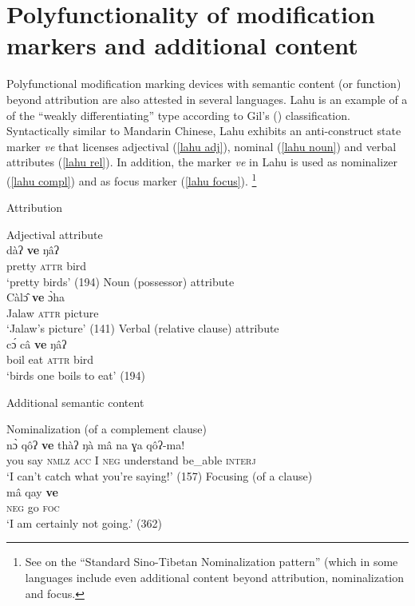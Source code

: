 \section[Polyfunctionality and additional content]{Polyfunctionality of modification markers and additional content}
Polyfunctional modification marking devices with semantic content (or function) beyond attribution are also attested in several languages. Lahu is an example of a  of the “weakly differentiating” type according to Gil's (\citeyear{gil2005}) classification. Syntactically similar to Mandarin Chinese, Lahu exhibits an anti-construct state marker \textit{ve} that licenses adjectival (\ref{lahu adj}), nominal (\ref{lahu noun}) and verbal attributes (\ref{lahu rel}). In addition, the marker \textit{ve} in Lahu is used as nominalizer (\ref{lahu compl}) and as focus marker (\ref{lahu focus}).
\footnote{See \citealt{bickel1999} on the “Standard Sino-Tibetan Nominalization pattern” (which in some languages include even additional content beyond attribution, nominalization and focus.}
\begin{exe}
\ex
{}
\begin{xlist}
\ex	\rm{Attribution}
\begin{xlist}
\ex	\rm{Adjectival attribute}\\
\gll	dàʔ	\textbf{ve}	ŋâʔ\\
	pretty	\textsc{attr}	bird\\
\glt	‘pretty birds’ (194)\label{lahu adj}
\ex	\rm{Noun (possessor) attribute}\\
\gll	Càl\^{ɔ}	\textbf{ve}	\`{ɔ}ha\\
	Jalaw	\textsc{attr}	picture\\
\glt	‘Jalaw's picture’ (141)\label{lahu noun}
\ex	\rm{Verbal (relative clause) attribute}\\
\gll	c\'{ɔ}	câ	\textbf{ve}	ŋâʔ\\
	boil	eat	\textsc{attr}	bird\\
\glt	‘birds one boils to eat’ (194)\label{lahu rel}
\end{xlist}
\ex	\rm{Additional semantic content}
\begin{xlist}
\ex \rm{Nominalization (of a complement clause)}\\
\gll	n\`{ɔ}	qôʔ \textbf{ve}	thàʔ	ŋà mâ	na ɣa	qôʔ-ma!\\
	you	say \textsc{nmlz}	\textsc{acc} I	\textsc{neg} understand	be\_able	\textsc{interj}\\
\glt	‘I can't catch what you're saying!’ (157)\label{lahu compl}
\ex	\rm{Focusing (of a clause)}\\
\gll	mâ		qay	\textbf{ve}\\
	\textsc{neg}	go	\textsc{foc}\\
\glt	‘I am certainly not going.’ (362)\label{lahu focus}
\end{xlist}
\end{xlist}
\end{exe}
